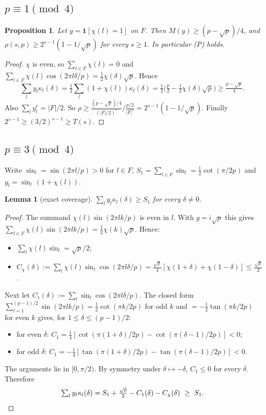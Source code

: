 \documentclass[11pt]{article}
\newtheorem{lemma}[theorem]{Lemma}
\newtheorem{proposition}[theorem]{Proposition}
\theoremstyle{remark}\newtheorem{remark}[theorem]{Remark}
\begin{document}
\subsection{$p\equiv1\pmod4$}
\begin{proposition}
Let $y=\mathbf 1[\chi(l)=1]$ on $F$. Then $M(y)\ge(p-\sqrt p)/4$, and $\rho(s,p)\ge 2^{s-1}(1-1/\sqrt p)$ for every $s\ge1$.
In particular (P) holds.
\end{proposition}
\begin{proof}
$\chi$ is even, so $\sum_{l\in F}\chi(l)=0$ and $\sum_{l\in F}\chi(l)\cos(2\pi l\delta/p)=\tfrac12\chi(\delta)\sqrt p$.
Hence
\[\textstyle\sum_l y_l\kappa_l(\delta)=\tfrac12\sum_l(1+\chi(l))\kappa_l(\delta)=\tfrac12\big(\tfrac p2-\tfrac12\chi(\delta)\sqrt p\big)\ge\tfrac{p-\sqrt p}4 .\]
Also $\sum_l y_l^r=|F|/2$. So $\rho\ge\frac{(p-\sqrt p)/4}{(|F|/2)^s}\big/\frac{p/2}{|F|^s}=2^{s-1}(1-1/\sqrt p)$.
Finally $2^{s-1}\ge(3/2)^{s-1}\ge T(s)$.
\end{proof}

\subsection{$p\equiv3\pmod4$}
Write $\sin_l=\sin(2\pi l/p)>0$ for $l\in F$, $S_1=\sum_{l\in F}\sin_l=\tfrac12\cot(\pi/2p)$ and
$y_l=\sin_l\,(1+\chi(l))$.

\begin{lemma}[exact coverage]\label{lem:cov}
$\sum_l y_l\kappa_l(\delta)\ge S_1$ for every $\delta\ne0$.
\end{lemma}
\begin{proof}
The summand $\chi(l)\sin(2\pi lk/p)$ is even in $l$. With $g=i\sqrt p$ this gives
$\sum_{l\in F}\chi(l)\sin(2\pi lk/p)=\tfrac12\chi(k)\sqrt p$. Hence:
\begin{itemize}
\item $\sum_l\chi(l)\sin_l=\sqrt p/2$;
\item $C_\chi(\delta):=\sum_l\chi(l)\sin_l\cos(2\pi l\delta/p)=\tfrac{\sqrt p}4[\chi(1+\delta)+\chi(1-\delta)]\le\tfrac{\sqrt p}2$.
\end{itemize}
Next let $C_1(\delta):=\sum_l\sin_l\cos(2\pi l\delta/p)$. The closed form
$\sum_{l=1}^{(p-1)/2}\sin(2\pi lk/p)=\tfrac12\cot(\pi k/2p)$ for odd $k$ and $=-\tfrac12\tan(\pi k/2p)$ for even $k$ gives,
for $1\le\delta\le(p-1)/2$:
\begin{itemize}
\item for even $\delta$: $C_1=\tfrac14[\cot(\pi(1+\delta)/2p)-\cot(\pi(\delta-1)/2p)]<0$;
\item for odd $\delta$: $C_1=-\tfrac14[\tan(\pi(1+\delta)/2p)-\tan(\pi(\delta-1)/2p)]<0$.
\end{itemize}
The arguments lie in $[0,\pi/2)$. By symmetry under $\delta\mapsto-\delta$, $C_1\le0$ for every $\delta$. Therefore
\[\textstyle\sum_l y_l\kappa_l(\delta)=S_1+\tfrac{\sqrt p}2-C_1(\delta)-C_\chi(\delta)\ \ge\ S_1 .\qedhere\]
\end{proof}
\end{document}
